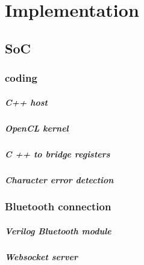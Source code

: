 %
%

\chapter{Implementation}
	\section{SoC}
		\subsection{coding}
			\paragraph{C++ host}
			\paragraph{OpenCL kernel}
			\paragraph{C ++ to bridge registers}
			\paragraph{Character error detection}
		\subsection{Bluetooth connection}
			\paragraph{Verilog Bluetooth module}
			\paragraph{Websocket server}
%  